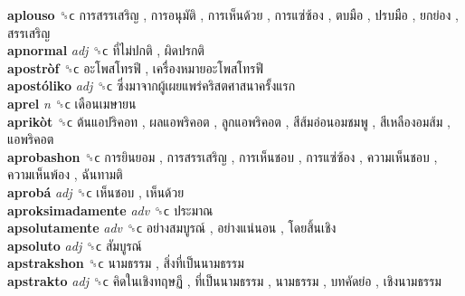 \textbf{aplouso} ␝ϲ   การสรรเสริญ ,  การอนุมัติ ,  การเห็นด้วย ,  การแซ่ซ้อง ,  ตบมือ ,  ปรบมือ ,  ยกย่อง ,  สรรเสริญ   \\
\textbf{apnormal} \emph{adj}  ␝ϲ   ที่ไม่ปกติ ,  ผิดปรกติ   \\
\textbf{apostròf} ␝ϲ   อะโพสโทรฟี ,  เครื่องหมายอะโพสโทรฟี   \\
\textbf{apostóliko} \emph{adj}  ␝ϲ   ซึ่งมาจากผู้เผยแพร่คริสตศาสนาครั้งแรก   \\
\textbf{aprel} \emph{n}  ␝ϲ   เดือนเมษายน   \\
\textbf{aprikòt} ␝ϲ   ต้นแอปริคอท ,  ผลแอพริคอต ,  ลูกแอพริคอต ,  สีส้มอ่อนอมชมพู ,  สีเหลืองอมส้ม ,  แอพริคอต   \\
\textbf{aprobashon} ␝ϲ   การยินยอม ,  การสรรเสริญ ,  การเห็นชอบ ,  การแซ่ซ้อง ,  ความเห็นชอบ ,  ความเห็นพ้อง ,  ฉันทามติ   \\
\textbf{aprobá} \emph{adj}  ␝ϲ   เห็นชอบ ,  เห็นด้วย   \\
\textbf{aproksimadamente} \emph{adv}  ␝ϲ   ประมาณ   \\
\textbf{apsolutamente} \emph{adv}  ␝ϲ   อย่างสมบูรณ์ ,  อย่างแน่นอน ,  โดยสิ้นเชิง   \\
\textbf{apsoluto} \emph{adj}  ␝ϲ   สัมบูรณ์   \\
\textbf{apstrakshon} ␝ϲ   นามธรรม ,  สิ่งที่เป็นนามธรรม   \\
\textbf{apstrakto} \emph{adj}  ␝ϲ   คิดในเชิงทฤษฏี ,  ที่เป็นนามธรรม ,  นามธรรม ,  บทคัดย่อ ,  เชิงนามธรรม   \\
